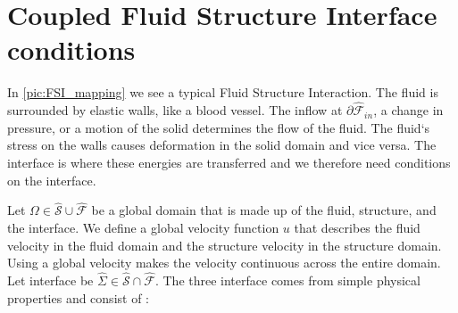 \section{Coupled Fluid Structure Interface conditions}
In \ref{pic:FSI_mapping} we see a typical Fluid Structure Interaction. The fluid is surrounded by elastic walls, like a blood vessel. The inflow at $\partial \hat{\mathcal{F}}_{in}$, a change in pressure, or a motion of the solid determines the flow of the fluid.
The fluid`s stress on the walls causes deformation in the solid domain and vice versa. The interface is where these energies are transferred and we therefore need conditions on the interface. \newline

Let $\Omega \in \hat{\mathcal{S}} \cup \hat{\mathcal{F}} $ be a global domain that is made up of the fluid, structure, and the interface. We define a global velocity function $u$ that describes the fluid velocity in the fluid domain and the structure velocity in the structure domain. Using a global velocity makes the velocity continuous across the entire domain. Let interface be $ \hat{\Sigma} \in \hat{\mathcal{S}} \cap \hat{\mathcal{F}}  $.\newline 
The three interface comes from simple physical properties and consist of \cite{Richter2016}:

